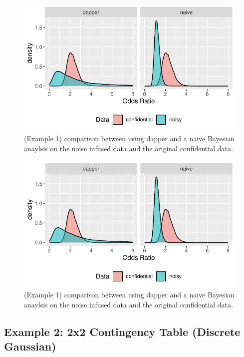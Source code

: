 \begin{figure}

{\centering \includegraphics{dppaper_files/figure-latex/post-or-compare-1} 

}

\caption{(Example 1) comparison between using dapper and a naive Bayesian anaylsis on the
noise infused data and the original confidential data.}\label{fig:post-or-compare}
\end{figure}

\begin{figure}

{\centering \includegraphics{dppaper_files/figure-latex/post-or-compare2-1} 

}

\caption{(Example 1) comparison between using dapper and a naive Bayesian anaylsis on the
noise infused data and the original confidential data.}\label{fig:post-or-compare2}
\end{figure}

\hypertarget{example-2-2x2-contingency-table-discrete-gaussian}{%
\subsection{Example 2: 2x2 Contingency Table (Discrete Gaussian)}\label{example-2-2x2-contingency-table-discrete-gaussian}}


